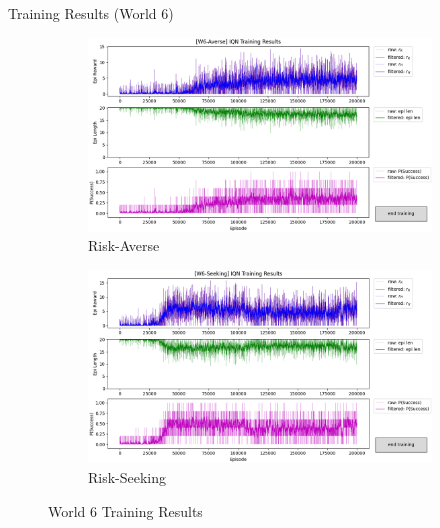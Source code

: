 \documentclass[aspectratio=1610, xcolor=dvipsnames]{packages/beamer}
\begin{document}
\begin{frame}{Training Results (World 6)}
     \begin{figure}
     \centering
         \begin{subfigure}[b]{\Wfig\textwidth} \centering
             \includegraphics[width=\textwidth]{../results/IDQN_W6/Fig_W6_JointQ_Averse}
             \caption{Risk-Averse} \label{fig:W6averse}
         \end{subfigure}
         \hfill
         \begin{subfigure}[b]{\Wfig\textwidth} \centering
             \includegraphics[width=\textwidth]{../results/IDQN_W6//Fig_W6_JointQ_Seeking}
             \caption{Risk-Seeking} \label{fig:W6seeking}
         \end{subfigure}
    \caption{World 6 Training Results}
    \label{fig:W6}
    \end{figure}
\end{frame}
\end{document}
